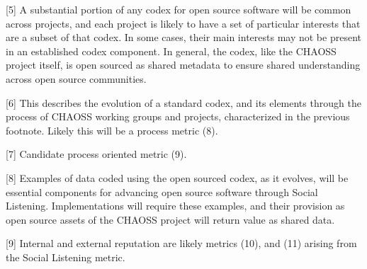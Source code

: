 {[}5{]} A substantial portion of any codex for open source software will
be common across projects, and each project is likely to have a set of
particular interests that are a subset of that codex. In some cases,
their main interests may not be present in an established codex
component. In general, the codex, like the CHAOSS project itself, is
open sourced as shared metadata to ensure shared understanding across
open source communities.

{[}6{]} This describes the evolution of a standard codex, and its
elements through the process of CHAOSS working groups and projects,
characterized in the previous footnote. Likely this will be a process
metric (8).

{[}7{]} Candidate process oriented metric (9).

{[}8{]} Examples of data coded using the open sourced codex, as it
evolves, will be essential components for advancing open source software
through Social Listening. Implementations will require these examples,
and their provision as open source assets of the CHAOSS project will
return value as shared data.

{[}9{]} Internal and external reputation are likely metrics (10), and
(11) arising from the Social Listening metric.
